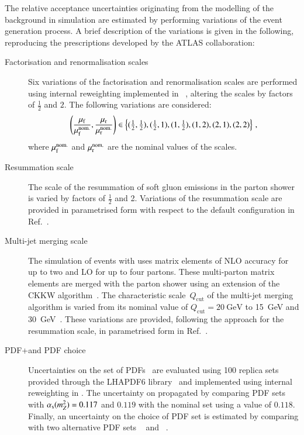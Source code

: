 The relative acceptance uncertainties originating from the modelling
of the \ZHF background in simulation are estimated by performing
variations of the event generation process. A brief description of the
variations is given in the following, reproducing the prescriptions
developed by the ATLAS collaboration:
\begin{description}

\item[Factorisation and renormalisation scales] Six variations of the
  factorisation and renormalisation scales are performed using
  internal reweighting implemented in
  \SHERPA[2.2.1]~\cite{Bothmann:2019yzt}, altering the scales by
  factors of $\frac{1}{2}$ and $2$. The following variations are
  considered:
  \begin{align*}
    \left( \frac{\mu_\mathrm{f}}{\mu_\mathrm{f}^{\text{nom.}}}, \frac{\mu_\mathrm{r}}{\mu_\mathrm{r}^{\text{nom.}}} \right) \in
    \left\{ (\tfrac{1}{2}, \tfrac{1}{2}), (\tfrac{1}{2}, 1), (1, \tfrac{1}{2}), (1, 2), (2, 1), (2, 2) \right\} \,\text{,}
  \end{align*}
  where $\mu_\mathrm{f}^{\text{nom.}}$ and $\mu_\mathrm{r}^{\text{nom.}}$ are the nominal
  values of the scales.

\item[Resummation scale] The scale of the resummation of soft gluon
  emissions in the \SHERPA parton shower is varied by factors of
  $\frac{1}{2}$ and 2. Variations of the resummation scale are
  provided in parametrised form with respect to the default \SHERPA
  configuration in Ref.~\cite{anders:2017}.

\item[Multi-jet merging scale] The simulation of \Zjets events with
  \SHERPA[2.2.1] uses matrix elements of NLO accuracy for up to two
  and LO for up to four partons. These multi-parton matrix elements
  are merged with the parton shower using an extension of the CKKW
  algorithm~\cite{Catani:2001cc,Hoeche:2009rj,Hoeche:2012yf}. The
  characteristic scale~$Q_{\text{cut}}$ of the multi-jet merging
  algorithm is varied from its nominal value of
  $Q_{\text{cut}} = \SI{20}{\GeV}$ to \SI{15}{\GeV} and
  \SI{30}{\GeV}~\cite{anders:2017}. These variations are provided,
  following the approach for the resummation scale, in parametrised
  form in Ref.~\cite{anders:2017}.

\item[PDF+\alphas and PDF choice] Uncertainties on the \NNPDF[3.0nnlo]
  set of PDFs~\cite{Ball:2014uwa} are evaluated using 100 replica sets
  provided through the \textsc{LHAPDF6} library~\cite{Buckley:2014ana}
  and implemented using internal reweighting in \SHERPA. The
  uncertainty on \alphas propagated by comparing \NNPDF[3.0nnlo] PDF
  sets with $\alpha_{\text{s}}(m_{Z}^2) = 0.117$ and $0.119$ with the nominal set
  using a value of $0.118$. Finally, an uncertainty on the choice of
  PDF set is estimated by comparing with two alternative PDF sets
  \MMHT[nnlo68cl]~\cite{Harland-Lang:2014zoa} and
  \CT[14nnlo]~\cite{Dulat:2015mca}.


\end{description}
